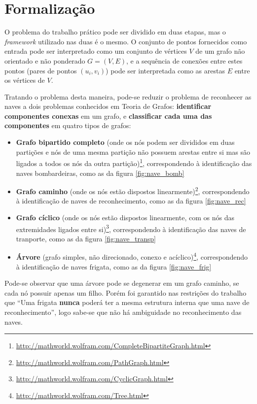 \section{Formalização} \label{sec:formalizacao}

O problema do trabalho prático pode ser dividido em duas etapas, mas o \textit{framework} utilizado nas duas é o mesmo. O conjunto de pontos fornecidos como entrada pode ser interpretado como um conjunto de vértices $V$ de um grafo não orientado e não ponderado $G=(V, E)$, e a sequência de conexões entre estes pontos (pares de pontos $(u_i, v_i)$) pode ser interpretada como as arestas $E$ entre os vértices de $V$. 

Tratando o problema desta maneira, pode-se reduzir o problema de reconhecer as naves a dois problemas conhecidos em Teoria de Grafos: \textbf{identificar componentes conexas} em um grafo, e \textbf{classificar cada uma das componentes} em quatro tipos de grafos:

\begin{itemize}
	\item \textbf{Grafo bipartido completo} (onde os nós podem ser divididos em duas partições e nós de uma mesma partição não possuem arestas entre si mas são ligados a todos os nós da outra partição)\footnote{\url{http://mathworld.wolfram.com/CompleteBipartiteGraph.html}}, correspondendo à identificação das naves bombardeiras, como as da figura \ref{fig:nave_bomb}
	\item \textbf{Grafo caminho} (onde os nós estão dispostos linearmente)\footnote{\url{http://mathworld.wolfram.com/PathGraph.html}}, correspondendo à identificação de naves de reconhecimento, como as da figura \ref{fig:nave_rec}
	\item \textbf{Grafo cíclico} (onde os nós estão dispostos linearmente, com os nós das extremidades ligados entre si)\footnote{\url{http://mathworld.wolfram.com/CyclicGraph.html}}, correspondendo à identificação das naves de tranporte, como as da figura \ref{fig:nave_transp}
	\item \textbf{Árvore} (grafo simples, não direcionado, conexo e acíclico)\footnote{\url{http://mathworld.wolfram.com/Tree.html}}, correspondendo à identificação de naves frigata, como as da figura \ref{fig:nave_frig}
\end{itemize}

Pode-se observar que uma árvore pode se degenerar em um grafo caminho, se cada nó possuir apenas um filho. Porém foi garantido nas restrições do trabalho que ``Uma frigata \textbf{nunca} poderá ter a mesma estrutura interna que uma nave de reconhecimento'', logo sabe-se que não há ambiguidade no reconhecimento das naves. 



